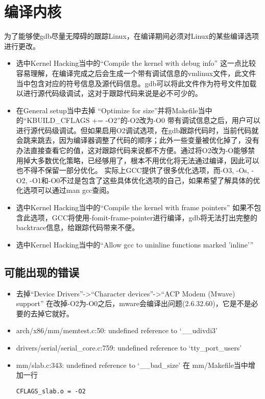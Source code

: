 \documentclass[b5paper,9pt,twoside,openany]{article}
\begin{document}
\section{编译内核}
为了能够使gdb尽量无障碍的跟踪Linux，在编译期间必须对Linux的某些编译选项进行更改。
\begin{itemize}
\item 选中Kernel Hacking当中的“Compile the kernel with debug info”
这一点比较容易理解，在编译完成之后会生成一个带有调试信息的vmlinux文件，此文件当中包含对应的符号信息及源代码信息。gdb可以将此文件作为符号文件加载以进行源代码级调试，这对于跟踪代码来说是必不可少的。
\item 在General setup当中去掉 “Optimize for size”并将Makefile当中的“KBUILD\_CFLAGS   += -O2”的-O2改为-O0
带有调试信息之后，用户可以进行源代码级调试。但如果启用O2调试选项，在gdb跟踪代码时，当前代码就会跳来跳去，因为编译器调整了代码的顺序；此外一些变量被优化掉了，没有办法直接查看它的值，这对跟踪代码来说都不方便。通过将O2改为-O能够禁用掉大多数优化策略，已经够用了，根本不用优化将无法通过编译，因此可以也不得不保留一部分优化。
实际上GCC提供了很多优化选项，而-O3, -Os, -O2, -O1和-O0不过是包含了这些具体优化选项的自己，如果希望了解具体的优化选项可以通过man gcc查阅。
\item 选中Kernel Hacking当中的“Compile the kernel with frame pointers”
如果不包含此选项，GCC将使用-fomit-frame-pointer进行编译，gdb将无法打出完整的backtrace信息，给跟踪代码带来不便。

\item 选中Kernel Hacking当中的“Allow gcc to uninline functions marked 'inline'”
\end{itemize}

\subsection{可能出现的错误}
\begin{itemize}
\item 去掉“Device Drivers”->“Character devices”->“ACP Modem (Mwave) support”
在改掉-O2为-O0之后，mware会编译出问题(2.6.32.60)，它是不是必要的去掉它就好。
\item arch/x86/mm/memtest.c:50: undefined reference to `__udivdi3'
\item drivers/serial/serial_core.c:759: undefined reference to `tty_port_users'
\item mm/slab.c:343: undefined reference to `__bad_size'
在 mm/Makefile当中增加一行
\begin{lstlisting}
CFLAGS_slab.o = -O2
\end{lstlisting}
\end{itemize}
\end{document}
